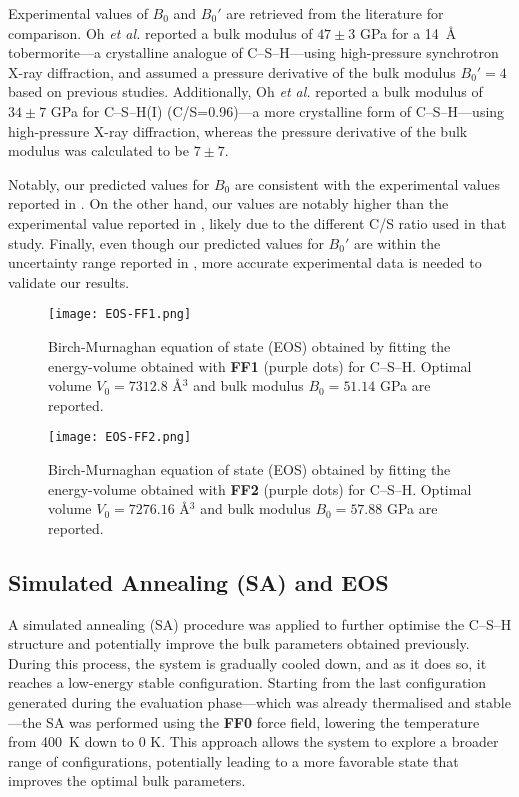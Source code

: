 Experimental values of $B_0$ and $B_0'$ are retrieved from the literature for comparison. Oh \emph{et al.} \cite{Oh2012} reported a bulk modulus of $47\pm3$ GPa for a 14~\AA{} tobermorite---a crystalline analogue of C--S--H---using high-pressure synchrotron X-ray diffraction, and assumed a pressure derivative of the bulk modulus $B_0'=4$ based on previous studies. Additionally, Oh \emph{et al.} \cite{Oh2011} reported a bulk modulus of $34\pm7$ GPa for C--S--H(I) (C/S=0.96)---a more crystalline form of C--S--H---using high-pressure X-ray diffraction, whereas the pressure derivative of the bulk modulus was calculated to be $7\pm7$.

Notably, our predicted values for $B_0$ are consistent with the experimental values reported in \cite{Oh2012}. On the other hand, our values are notably higher than the experimental value reported in \cite{Oh2011}, likely due to the different C/S ratio used in that study. Finally, even though our predicted values for $B_0'$ are within the uncertainty range reported in \cite{Oh2011}, more accurate experimental data is needed to validate our results.

\begin{figure}[h!]
    \centering
    \texttt{[image: EOS-FF1.png]}
    \caption{
    Birch-Murnaghan equation of state (EOS) obtained by fitting the energy-volume obtained with \textbf{FF1} (purple dots) for C--S--H. Optimal volume $V_0=7312.8$ \AA$^3$ and bulk modulus $B_0=51.14$ GPa are reported.
    }
    \label{fig:eos-ff1}
\end{figure}
\begin{figure}[H]
    \centering
    \texttt{[image: EOS-FF2.png]}
    \caption{
    Birch-Murnaghan equation of state (EOS) obtained by fitting the energy-volume obtained with \textbf{FF2} (purple dots) for C--S--H. Optimal volume $V_0=7276.16$ \AA$^3$ and bulk modulus $B_0=57.88$ GPa are reported.}
    \label{fig:eos-ff2}
\end{figure}

\subsection{Simulated Annealing (SA) and EOS}
A simulated annealing (SA) procedure was applied to further optimise the C--S--H structure and potentially improve the bulk parameters obtained previously. During this process, the system is gradually cooled down, and as it does so, it reaches a low-energy stable configuration. Starting from the last configuration generated during the evaluation phase---which was already thermalised and stable---the SA was performed using the \textbf{FF0} force field, lowering the temperature from 400~K down to 0 K. This approach allows the system to explore a broader range of configurations, potentially leading to a more favorable state that improves the optimal bulk parameters.


